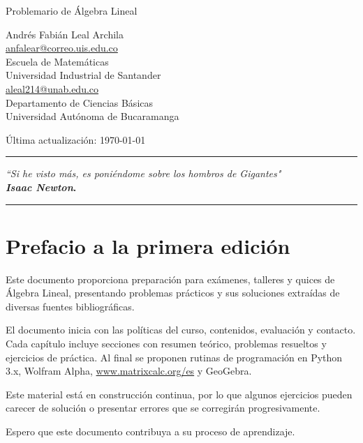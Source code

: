 \documentclass[12pt, fleqn, leqno]{book}
\theoremstyle{plain}
\theoremstyle{definition}
\begin{document}
 
	\setlength{\headheight}{15pt}
\begin{titlepage}
  \centering
  \vspace*{2cm}
  {\LARGE Problemario de Álgebra Lineal \par}
  \vspace{2cm}
  {\large Andrés Fabián Leal Archila\\ \url{anfalear@correo.uis.edu.co}\\ Escuela de Matemáticas \\ Universidad Industrial de Santander \\ \url{aleal214@unab.edu.co}\\ Departamento de Ciencias Básicas \\ Universidad Autónoma de Bucaramanga\par} 
  \vfill
 {\large Última actualización: \today \par}
 
  {\rule[0.1mm]{\textwidth}{0.5mm}
  \begin{flushright}
    \emph{``Si he visto más, es poniéndome sobre los hombros de Gigantes"}\\
    \textbf{\textit{Isaac Newton}.}
  \end{flushright}
  {\rule[0.1mm]{\textwidth}{0.5mm}}}
  \vspace*{2cm}
 
\end{titlepage}

\chapter*{Prefacio a la primera edición}

Este documento proporciona preparación para exámenes, talleres y quices de Álgebra Lineal, presentando problemas prácticos y sus soluciones extraídas de diversas fuentes bibliográficas.

El documento inicia con las políticas del curso, contenidos, evaluación y contacto. Cada capítulo incluye secciones con resumen teórico, problemas resueltos y ejercicios de práctica. Al final se proponen rutinas de programación en Python 3.x, Wolfram Alpha, \url{www.matrixcalc.org/es} y GeoGebra.

Este material está en construcción continua, por lo que algunos ejercicios pueden carecer de solución o presentar errores que se corregirán progresivamente.

Espero que este documento contribuya a su proceso de aprendizaje.
\end{document}
